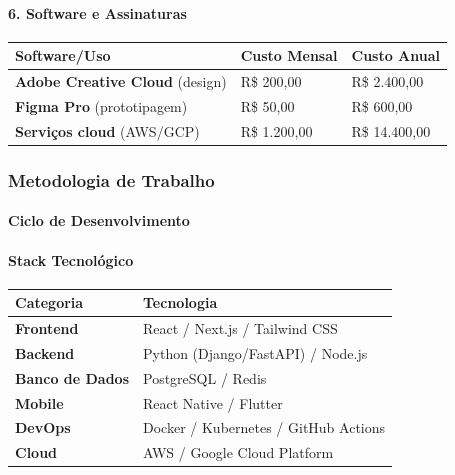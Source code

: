 \bigskip

\paragraph{6. Software e Assinaturas}

\bigskip\noindent
\begin{tabular}{p{}p{}p{}}
\toprule
Software/Uso & Custo Mensal & Custo Anual \\
\hline
\textbf{Adobe Creative Cloud} (design) & R\$ 200,00 & R\$ 2.400,00 \\
\textbf{Figma Pro} (prototipagem) & R\$ 50,00 & R\$ 600,00 \\
\textbf{Serviços cloud} (AWS/GCP) & R\$ 1.200,00 & R\$ 14.400,00 \\
\bottomrule
\end{tabular}

\bigskip

\subsubsection{Metodologia de Trabalho}

\paragraph{Ciclo de Desenvolvimento}

\paragraph{Stack Tecnológico}

\bigskip\noindent
\begin{tabular}{p{}p{}}
\toprule
Categoria & Tecnologia \\
\hline
\textbf{Frontend} & React / Next.js / Tailwind CSS \\
\textbf{Backend} & Python (Django/FastAPI) / Node.js \\
\textbf{Banco de Dados} & PostgreSQL / Redis \\
\textbf{Mobile} & React Native / Flutter \\
\textbf{DevOps} & Docker / Kubernetes / GitHub Actions \\
\textbf{Cloud} & AWS / Google Cloud Platform \\
\bottomrule
\end{tabular}

